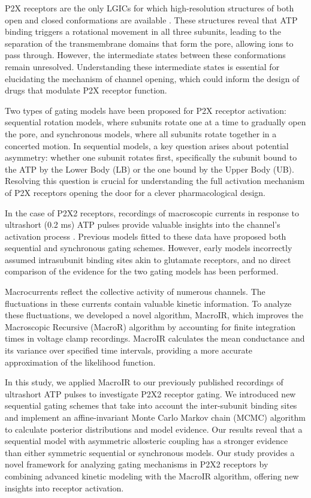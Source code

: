 \documentclass[pdflatex,sn-mathphys-num]{sn-jnl}%
\theoremstyle{thmstyleone}%
\theoremstyle{thmstyletwo}%
\theoremstyle{thmstylethree}%
\begin{document}
P2X receptors are the only LGICs for which high-resolution structures of both open and closed conformations are available \cite{cerrada_p2x,abierta_p2x}. These structures reveal that ATP binding triggers a rotational movement in all three subunits, leading to the separation of the transmembrane domains that form the pore, allowing ions to pass through. However, the intermediate states between these conformations remain unresolved. Understanding these intermediate states is essential for elucidating the mechanism of channel opening, which could inform the design of drugs that modulate P2X receptor function.

Two types of gating models have been proposed for P2X receptor activation: sequential rotation models, where subunits rotate one at a time to gradually open the pore, and synchronous models, where all subunits rotate together in a concerted motion. In sequential models, a key question arises about potential asymmetry: whether one subunit rotates first, specifically the subunit bound to the ATP by the Lower Body (LB) or the one bound by the Upper Body (UB). Resolving this question is crucial for understanding the full activation mechanism of P2X receptors opening the door for a clever pharmacological design. 

In the case of P2X2 receptors, recordings of macroscopic currents in response to ultrashort (0.2 ms) ATP pulses provide valuable insights into the channel's activation process \cite{Moffatt_hume}. Previous models fitted to these data have proposed both sequential and synchronous gating schemes. However, early models incorrectly assumed intrasubunit binding sites akin to glutamate receptors, and no direct comparison of the evidence for the two gating models has been performed. 

Macrocurrents reflect the collective activity of numerous channels. The fluctuations in these currents contain valuable kinetic information. To analyze these fluctuations, we developed a novel algorithm, MacroIR, which improves the Macroscopic Recursive (MacroR) algorithm by accounting for finite integration times in voltage clamp recordings. MacroIR calculates the mean conductance and its variance over specified time intervals, providing a more accurate approximation of the likelihood function.

In this study, we applied MacroIR to our previously published recordings of ultrashort ATP pulses to investigate P2X2 receptor gating. We introduced new sequential gating schemes that take into account the inter-subunit binding sites and implement an affine-invariant Monte Carlo Markov chain (MCMC) algorithm to calculate posterior distributions and model evidence. Our results reveal that a sequential model with asymmetric allosteric coupling has a stronger evidence than either symmetric sequential or synchronous models. Our study provides a novel framework for analyzing gating mechanisms in P2X2 receptors by combining advanced kinetic modeling with the MacroIR algorithm, offering new insights into receptor activation.
\end{document}
